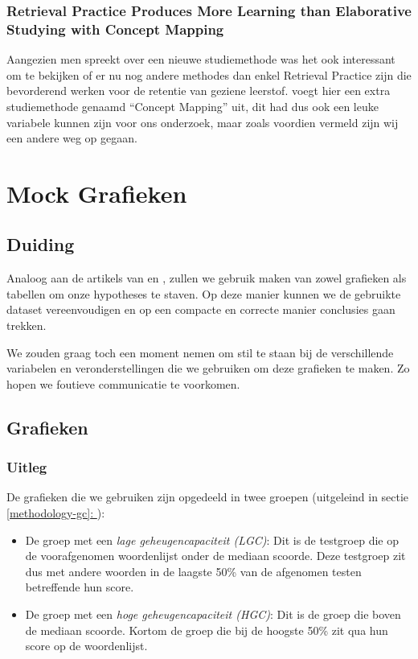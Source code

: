\documentclass[12pt,a4paper]{article}
\newcommand{\customref}[1]{\underline{\ref{#1}: \nameref{#1}}}
\begin{document}
        \subsubsection{Retrieval Practice Produces More Learning than Elaborative Studying with Concept Mapping}
        
        Aangezien men spreekt over een nieuwe studiemethode was het ook interessant om te bekijken of er nu nog andere methodes dan enkel Retrieval Practice zijn die bevorderend werken voor de retentie van geziene leerstof. \cite{JeffreyKarpicke2011} voegt hier een extra studiemethode genaamd ``Concept Mapping'' uit, dit had dus ook een leuke variabele kunnen zijn voor ons onderzoek, maar zoals voordien vermeld zijn wij een andere weg op gegaan.
    
    \newpage
    \section{Mock Grafieken}
    
    	\subsection{Duiding}
    	
    	Analoog aan de artikels van \cite{HenryRoediger2006} en \cite{Agarwal2008}, zullen we gebruik maken van zowel grafieken als tabellen om onze hypotheses te staven. Op deze manier kunnen we de gebruikte dataset vereenvoudigen en op een compacte en correcte manier conclusies gaan trekken.\\
    	\par
    	\noindent
    	We zouden graag toch een moment nemen om stil te staan bij de verschillende variabelen en veronderstellingen die we gebruiken om deze grafieken te maken. Zo hopen we foutieve communicatie te voorkomen.
    	
    	\subsection{Grafieken}
    	
    	\subsubsection{Uitleg}
    	De grafieken die we gebruiken zijn opgedeeld in twee groepen (uitgeleind in sectie \customref{methodology-gc}):
    	\begin{itemize}
    		\item De groep met een \textit{lage geheugencapaciteit (LGC)}: Dit is de testgroep die op de voorafgenomen woordenlijst onder de mediaan scoorde. Deze testgroep zit dus met andere woorden in de laagste 50\% van de afgenomen testen betreffende hun score.
    		\item De groep met een \textit{hoge geheugencapaciteit (HGC)}: Dit is de groep die boven de mediaan scoorde. Kortom de groep die bij de hoogste 50\% zit qua hun score op de woordenlijst.
    	\end{itemize}
    
\end{document}
